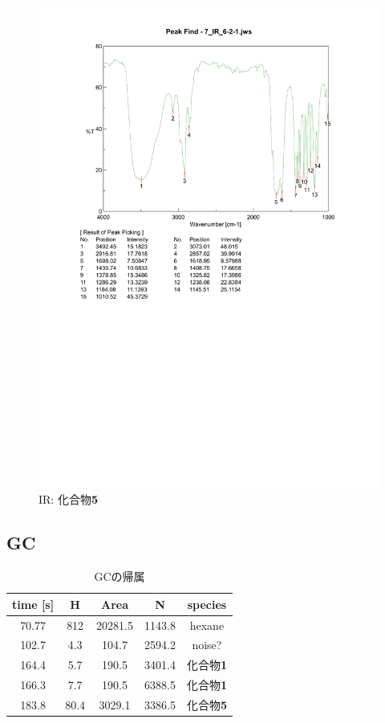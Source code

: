 \documentclass{ltjsarticle}
\theoremstyle{definition}
\numberwithin{equation}{section}
\begin{document}
\begin{figure}[htbp]
\begin{center}
\includegraphics[width = 15 cm]{IR_6-2-1.pdf}
\caption{IR: 化合物\textbf{5}}
\label{IR_6-2-1}
\end{center}
\end{figure}

\newpage
\subsection{GC}
\begin{table}[htp]
\caption{GCの帰属}
\begin{center}
\begin{tabular}{ccccc}
\toprule
time [s] & H & Area & N & species\\
\midrule
70.77 & 812 & 20281.5 & 1143.8 & hexane\\
102.7 & 4.3 & 104.7 & 2594.2 & noise? \\
164.4 & 5.7 & 190.5 & 3401.4 & 化合物\textbf{1}\\
166.3 & 7.7 & 190.5 & 6388.5 & 化合物\textbf{1}\\
183.8 & 80.4 & 3029.1 & 3386.5 & 化合物\textbf{5} \\
\bottomrule
\end{tabular}
\end{center}
\label{GC_6-2_attribute}
\end{table}%
\end{document}
